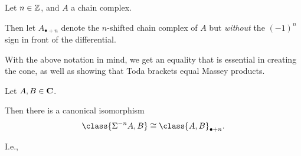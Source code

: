 \begin{notation}
    Let \( n \in {\mathbb{Z}} \), and \( A \) a chain complex.
    
    Then let \( A_{\bullet+n} \) denote the \( n \)-shifted chain complex of \( A \) but \emph{without} the \( (-1)^n \) sign in front of the differential.
\end{notation}

With the above notation in mind, we get an equality that is essential in creating the cone, as well as showing that Toda brackets equal Massey products.

\begin{lemma}
    \label{lem:shift_one_component_inner_product_chain_complex}
    Let \( A, B \in \operatorname{\mathbf{C}} \).

    Then there is a canonical isomorphism
    \[
        \class{\Sigma^{-n} A, B} \cong \class{A, B}_{\bullet+n}.
    \]

    I.e.,
    \begin{center}
    \end{center}
\end{lemma}
